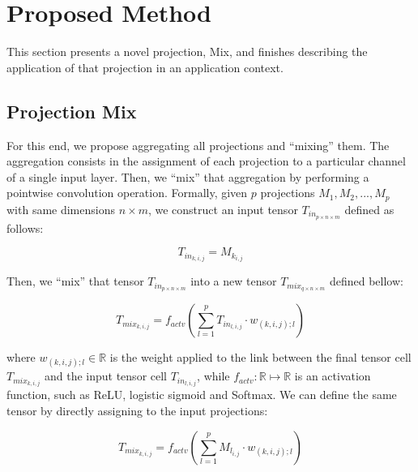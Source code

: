 

\section{Proposed Method}

This section presents a novel projection, \gls{Mix}, and finishes describing the application of that projection in an application context. 

\subsection{Projection Mix}


For this end, we propose aggregating all projections and ``mixing'' them. The aggregation consists in the assignment of each projection to a particular channel of a single input layer. Then, we ``mix'' that aggregation by performing a pointwise convolution operation. Formally, given $p$ projections $M_1, M_2, ..., M_p$ with same dimensions $n \times m$, we construct an input tensor $T_{in_{p \times n \times m}}$ defined as follows:

\begin{equation}
	T_{in_{k,i,j}} = M_{k_{i,j}}
\end{equation}

\noindent Then, we ``mix'' that tensor $T_{in_{p \times n \times m}}$ into a new tensor $T_{mix_{q \times n \times m}}$ defined bellow:

\begin{equation}
	T_{mix_{k,i,j}} = f_{actv}\left(\sum\limits_{l=1}^{p}T_{in_{l,i,j}} \cdot w_{(k,i,j);l}\right)
\end{equation} 

\noindent where $w_{(k,i,j);l} \in \mathbb{R}$ is the weight applied to the link between the final tensor cell $T_{mix_{k,i,j}}$ and the input tensor cell $T_{in_{l,i,j}}$, while $f_{actv}: \mathbb{R} \mapsto \mathbb{R}$ is an activation function, such as ReLU, logistic sigmoid and Softmax. We can define the same tensor by directly assigning to the input projections:

\begin{equation}
	\label{eq:mix}
	T_{mix_{k,i,j}} = f_{actv}\left(\sum\limits_{l=1}^{p}M_{l_{i,j}} \cdot w_{(k,i,j);l}\right)
\end{equation}

